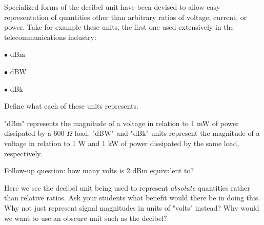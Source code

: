 

Specialized forms of the decibel unit have been devised to allow easy representation of quantities other than arbitrary ratios of voltage, current, or power.  Take for example these units, the first one used extensively in the telecommunications industry:

\medskip
\item{$\bullet$} dBm
\item{$\bullet$} dBW
\item{$\bullet$} dBk
\medskip

Define what each of these units represents.







"dBm" represents the magnitude of a voltage in relation to 1 mW of power dissipated by a 600 $\Omega$ load.  "dBW" and "dBk" units represent the magnitude of a voltage in relation to 1 W and 1 kW of power dissipated by the same load, respectively.

\vskip 10pt

Follow-up question: how many volts is 2 dBm equivalent to?







Here we see the decibel unit being used to represent {\it absolute} quantities rather than relative ratios.  Ask your students what benefit would there be in doing this.  Why not just represent signal magnitudes in units of "volts" instead?  Why would we want to use an obscure unit such as the decibel?




